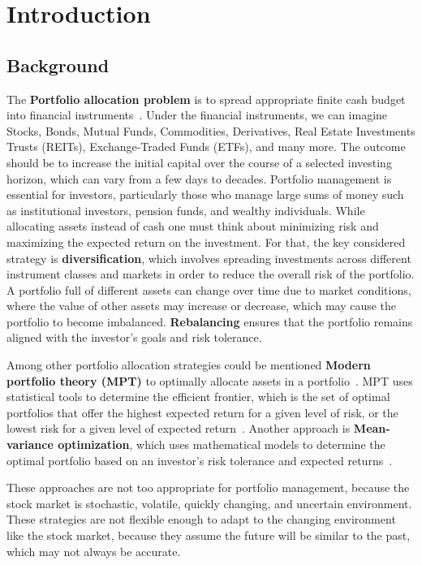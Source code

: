 \documentclass[../xlapes02]{subfiles}
\begin{document}
    \chapter{Introduction}\label{ch:introduction}


    \section{Background}\label{sec:background}
    The \textbf{Portfolio allocation problem} is to spread appropriate finite cash budget into financial instruments~\cite{Model-Free-Reinforcement-Learning-for-Asset-Allocation}.
    Under the financial instruments, we can imagine Stocks, Bonds, Mutual Funds, Commodities, Derivatives, Real Estate Investments Trusts (REITs), Exchange-Traded Funds (ETFs), and many more.
    The outcome should be to increase the initial capital over the course of a selected investing horizon, which can vary from a few days to decades.
    Portfolio management is essential for investors, particularly those who manage large sums of money such as institutional investors, pension funds, and wealthy individuals.
    While allocating assets instead of cash one must think about minimizing risk and maximizing the expected return on the investment.
    For that, the key considered strategy is \textbf{diversification}, which involves spreading investments across different instrument classes and markets in order to reduce the overall risk of the portfolio.
    A portfolio full of different assets can change over time due to market conditions, where the value of other assets may increase or decrease, which may cause the portfolio to become imbalanced.
    \textbf{Rebalancing} ensures that the portfolio remains aligned with the investor's goals and risk tolerance.

    Among other portfolio allocation strategies could be mentioned \textbf{Modern portfolio theory (MPT)} to optimally allocate assets in a portfolio~\cite{enwiki:1043516653}.
    MPT uses statistical tools to determine the efficient frontier, which is the set of optimal portfolios that offer the highest expected return for a given level of risk, or the lowest risk for a given level of expected return~\cite{sirucek-2015}.
    Another approach is \textbf{Mean-variance optimization}, which uses mathematical models to determine the optimal portfolio based on an investor's risk tolerance and expected returns~\cite{meanvarianceportfoliooptimazation}.

    These approaches are not too appropriate for portfolio management, because the stock market is stochastic, volatile, quickly changing, and uncertain environment.
    These strategies are not flexible enough to adapt to the changing environment like the stock market, because they assume the future will be similar to the past, which may not always be accurate.
\end{document}
